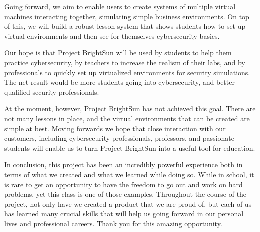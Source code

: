 \documentclass[openright]{report}
\begin{document}
\par Going forward, we aim to enable users to create systems of multiple virtual machines interacting together, simulating simple business environments. On top of this, we will build a robust lesson system that shows students how to set up virtual environments and then see for themselves cybersecurity basics.

\par Our hope is that Project BrightSun will be used by students to help them practice cybersecurity, by teachers to increase the realism of their labs, and by professionals to quickly set up virtualized environments for security simulations. The net result would be more students going into cybersecurity, and better qualified security professionals.

\par At the moment, however, Project BrightSun has not achieved this goal. There are not many lessons in place, and the virtual environments that can be created are simple at best. Moving forwards we hope that close interaction with our customers, including cybersecurity professionals, professors, and passionate students will enable us to turn Project BrightSun into a useful tool for education.

\par In conclusion, this project has been an incredibly powerful experience both in terms of what we created and what we learned while doing so. While in school, it is rare to get an opportunity to have the freedom to go out and work on hard problems, yet this class is one of those examples. Throughout the course of the project, not only have we created a product that we are proud of, but each of us has learned many crucial skills that will help us going forward in our personal lives and professional careers. Thank you for this amazing opportunity.
\end{document}
